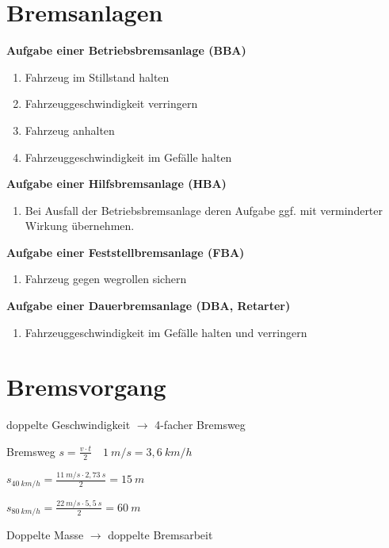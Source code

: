 \section{Bremsanlagen}\label{bremsanlagen}

\textbf{Aufgabe einer Betriebsbremsanlage (BBA)}

\begin{enumerate}
\item
  Fahrzeug im Stillstand halten
\item
  Fahrzeuggeschwindigkeit verringern
\item
  Fahrzeug anhalten
\item
  Fahrzeuggeschwindigkeit im Gefälle halten
\end{enumerate}

\textbf{Aufgabe einer Hilfsbremsanlage (HBA)}

\begin{enumerate}
\item
  Bei Ausfall der Betriebsbremsanlage deren Aufgabe ggf. mit
  verminderter Wirkung übernehmen.
\end{enumerate}

\textbf{Aufgabe einer Feststellbremsanlage (FBA)}

\begin{enumerate}
\item
  Fahrzeug gegen wegrollen sichern
\end{enumerate}

\textbf{Aufgabe einer Dauerbremsanlage (DBA, Retarter)}

\begin{enumerate}
\item
  Fahrzeuggeschwindigkeit im Gefälle halten und verringern
\end{enumerate}

\section{Bremsvorgang}\label{bremsvorgang}

doppelte Geschwindigkeit $\to$ 4-facher Bremsweg

Bremsweg
$\boxed{s = \frac{v \cdot t}{2}} \quad \boxed{1~m/s = 3,6~km/h}$

$s_{40~km/h} = \frac{11~m/s \cdot 2,73~s}{2} = 15~m$

$s_{80~km/h} = \frac{22~m/s \cdot 5,5~s}{2} = 60~m$

Doppelte Masse $\to$ doppelte Bremsarbeit

